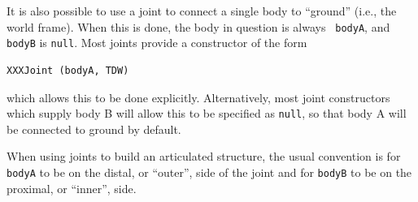 It is also possible to use a joint to connect a single body to ``ground''
(i.e., the world frame). When this is done, the body in question is always {\tt
bodyA}, and {\tt bodyB} is {\tt null}. Most joints provide a constructor of the
form
%
\begin{lstlisting}[]
  XXXJoint (bodyA, TDW)
\end{lstlisting}
%
which allows this to be done explicitly. Alternatively, most joint
constructors which supply body B will allow this to be specified as
{\tt null}, so that body A will be connected to ground by default.

\begin{sideblock}
When using joints to build an articulated structure, the usual convention is
for {\tt bodyA} to be on the distal, or ``outer'', side of the joint and for
{\tt bodyB} to be on the proximal, or ``inner'', side.
\end{sideblock}

